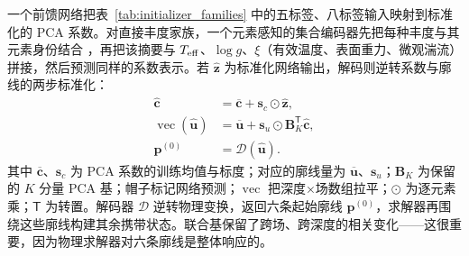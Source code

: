 一个前馈网络把表~\ref{tab:initializer_families} 中的五标签、八标签输入映射到标准化的 PCA 系数。对直接丰度家族，一个元素感知的集合编码器先把每种丰度与其元素身份结合 \citep{Zaheer2017}，再把该摘要与 $T_{\rm eff}$、$\log g$、$\xi$（有效温度、表面重力、微观湍流）拼接，然后预测同样的系数表示。若 $\widehat{\mathbf z}$ 为标准化网络输出，解码则逆转系数与廓线的两步标准化：
\begin{equation}
\begin{aligned}
\widehat{\mathbf c}
&=\overline{\mathbf c}+\mathbf{s}_{c}\odot\widehat{\mathbf z},
\\
\operatorname{vec}(\widehat{\mathbf u})
&=\overline{\mathbf u}
+\mathbf{s}_{u}\odot\mathbf{B}_{K}^{\mathsf T}\widehat{\mathbf c},
\\
\mathbf{p}^{(0)}&=\mathcal{D}(\widehat{\mathbf{u}}).
\end{aligned}
\end{equation}
\noindent 其中 $\overline{\mathbf c}$、$\mathbf{s}_c$ 为 PCA 系数的训练均值与标度；对应的廓线量为 $\overline{\mathbf u}$、$\mathbf{s}_u$；$\mathbf{B}_K$ 为保留的 $K$ 分量 PCA 基；帽子标记网络预测；$\operatorname{vec}$ 把深度×场数组拉平；$\odot$ 为逐元素乘；$\mathsf T$ 为转置。解码器 $\mathcal{D}$ 逆转物理变换，返回六条起始廓线 $\mathbf{p}^{(0)}$，求解器再围绕这些廓线构建其余携带状态。联合基保留了跨场、跨深度的相关变化——这很重要，因为物理求解器对六条廓线是整体响应的。

